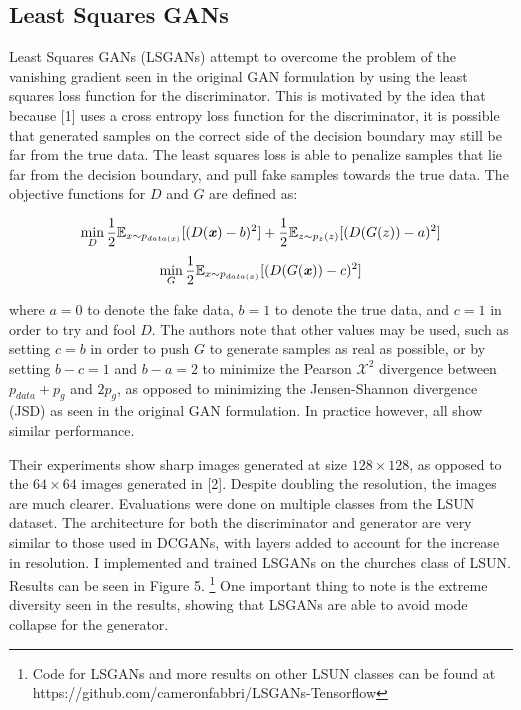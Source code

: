 \documentclass[9pt]{article}
\begin{document}
\subsection{Least Squares GANs}
Least Squares GANs (LSGANs) attempt to overcome the problem of the vanishing gradient seen in the original GAN formulation by using the least squares loss function for the
discriminator. This is motivated by the idea that because [1] uses a cross entropy loss function for the discriminator, it is possible that generated samples on the correct side of the
decision boundary may still be far from the true data. The least squares loss is able to penalize samples that lie far from the decision boundary, and pull fake samples towards the
true data. The objective functions for $D$ and $G$ are defined as:

\[\min\limits_{D} \frac{1}{2} \mathbb{E}_{x \sim p_{data(x)}} [(D(\textbf{\textit{x}})-b)^2] + \frac{1}{2} \mathbb{E}_{z \sim p_z(z)}[(D(G(z)) - a)^2]\]
\[\min\limits_{G} \frac{1}{2} \mathbb{E}_{x \sim p_{data(x)}} [(D(G(\textbf{\textit{x}}))-c)^2] \]

\noindent where $a=0$ to denote the fake data, $b=1$ to denote the true data, and $c=1$ in order to try and fool $D$. The authors note that other values
may be used, such as setting $c=b$ in order to push $G$ to generate samples as real as possible, or by setting $b-c=1$ and $b-a=2$ to minimize the Pearson
$\mathcal{X}^2$ divergence between $p_{data}+p_g$ and $2p_g$, as opposed to minimizing the Jensen-Shannon divergence (JSD) as seen in the original GAN
formulation. In practice however, all show similar performance. \newline

\noindent Their experiments show sharp images generated at size $128\times128$, as opposed to the $64\times64$ images generated in [2]. Despite doubling
the resolution, the images are much clearer. Evaluations were done on multiple classes from the LSUN dataset. The architecture for both the discriminator
and generator are very similar to those used in DCGANs, with layers added to account for the increase in resolution. I implemented and trained LSGANs on the churches
class of LSUN. Results can be seen in Figure 5. \footnote{Code for LSGANs and more results on other LSUN classes can be found at https://github.com/cameronfabbri/LSGANs-Tensorflow}
One important thing to note is the extreme diversity seen in the results, showing that LSGANs are able to avoid mode collapse for the generator.
\end{document}
